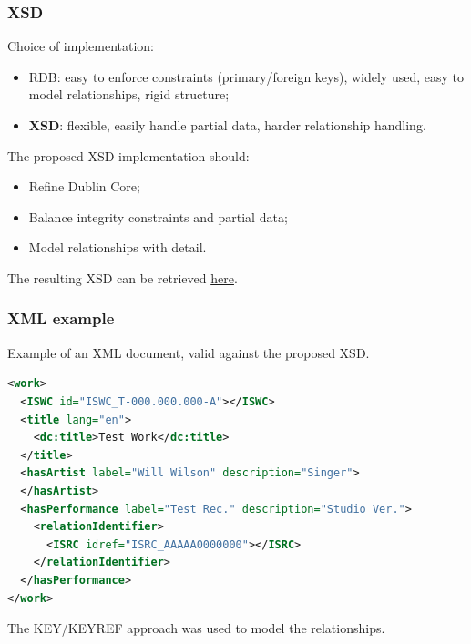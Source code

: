 \documentclass{beamer}
\newcommand\rb[1]{\textcolor{ThemeRed}{\textbf{#1}}}
\begin{document}
  \begin{frame}
    \frametitle{XSD}

    Choice of implementation:

    \vspace{0.5em}

    \begin{itemize}
      \item RDB: easy to enforce constraints (primary/foreign keys), widely used, easy to model relationships, rigid structure;
      \item \rb{XSD}: flexible, easily handle partial data, harder relationship handling.
    \end{itemize}

    \vspace{1.5em}

    The proposed XSD implementation should:

    \vspace{0.5em}

    \begin{itemize}
      \item Refine Dublin Core;
      \item Balance integrity constraints and partial data;
      \item Model relationships with detail. 
    \end{itemize}

    \vspace{1.5em}

    The resulting XSD can be retrieved \href{https://github.com/pindri/ODMC_exam/blob/master/odmc.xsd}{here}.
  \end{frame}




  \begin{frame}[fragile]
    \frametitle{XML example}

    Example of an XML document, valid against the proposed XSD.

    \vspace{0.5em}

    \lstset{basicstyle=\small}
\begin{lstlisting}[language=XML]
<work>
  <ISWC id="ISWC_T-000.000.000-A"></ISWC>
  <title lang="en">
    <dc:title>Test Work</dc:title>
  </title>
  <hasArtist label="Will Wilson" description="Singer">
  </hasArtist>
  <hasPerformance label="Test Rec." description="Studio Ver.">
    <relationIdentifier>
      <ISRC idref="ISRC_AAAAA0000000"></ISRC>
    </relationIdentifier>
  </hasPerformance>
</work>
\end{lstlisting}

    \vspace{1em}

    The KEY/KEYREF approach was used to model the relationships.
  \end{frame}
\end{document}
